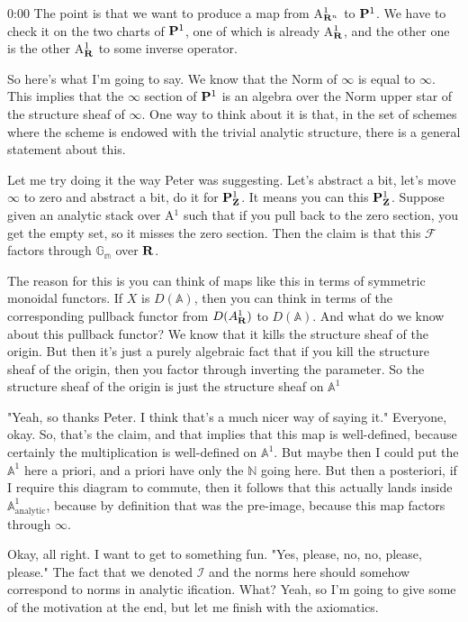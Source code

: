 \begin{unfinished}{0:00}
The point is that we want to produce a map from A$^1_{\R^n}$ to $\P^1$. We have to check it on the two charts of $\P^1$, one of which is already A$^1_\R$, and the other one is the other A$^1_\R$ to some inverse operator.

So here's what I'm going to say. We know that the Norm of $\infty$ is equal to $\infty$. This implies that the $\infty$ section of $\P^1$ is an algebra over the Norm upper star of the structure sheaf of $\infty$. One way to think about it is that, in the set of schemes where the scheme is endowed with the trivial analytic structure, there is a general statement about this.

Let me try doing it the way Peter was suggesting. Let's abstract a bit, let's move $\infty$ to zero and abstract a bit, do it for $\P^1_\Z$. It means you can this $\P^1_\Z$. Suppose given an analytic stack over A$^1$ such that if you pull back to the zero section, you get the empty set, so it misses the zero section. Then the claim is that this $\mathcal{F}$ factors through $\mathbb{G}_{\mathbb{m}}$ over $\R$.

The reason for this is you can think of maps like this in terms of symmetric monoidal functors. If $X$ is $D(\mathbb{A})$, then you can think in terms of the corresponding pullback functor from $D(A^1_\R)$ to $D(\mathbb{A})$. And what do we know about this pullback functor? We know that it kills the structure sheaf of the origin. But then it's just a purely algebraic fact that if you kill the structure sheaf of the origin, then you factor through inverting the parameter. So the structure sheaf of the origin is just the structure sheaf on $\mathbb{A}^1$



"Yeah, so thanks Peter. I think that's a much nicer way of saying it." Everyone, okay. So, that's the claim, and that implies that this map is well-defined, because certainly the multiplication is well-defined on $\mathbb{A}^1$. But maybe then I could put the $\mathbb{A}^1$ here a priori, and a priori have only the $\mathbb{N}$ going here. But then a posteriori, if I require this diagram to commute, then it follows that this actually lands inside $\mathbb{A}^1_\text{analytic}$, because by definition that was the pre-image, because this map factors through $\infty$.

Okay, all right. I want to get to something fun. "Yes, please, no, no, please, please." The fact that we denoted $\mathcal{I}$ and the norms here should somehow correspond to norms in analytic ification. What? Yeah, so I'm going to give some of the motivation at the end, but let me finish with the axiomatics. 


\end{unfinished}
